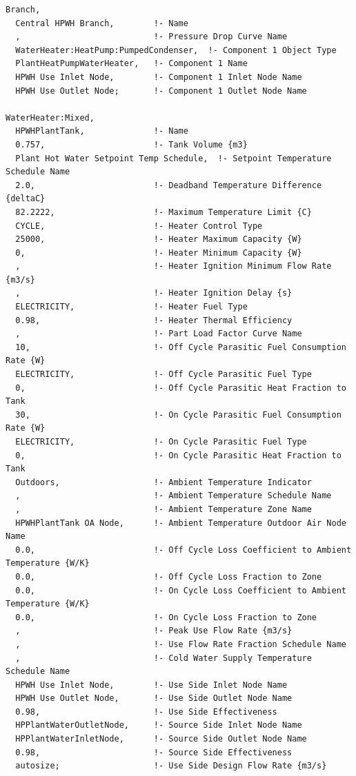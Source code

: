 \begin{lstlisting}
Branch,
  Central HPWH Branch,        !- Name
  ,                           !- Pressure Drop Curve Name
  WaterHeater:HeatPump:PumpedCondenser,  !- Component 1 Object Type
  PlantHeatPumpWaterHeater,   !- Component 1 Name
  HPWH Use Inlet Node,        !- Component 1 Inlet Node Name
  HPWH Use Outlet Node;       !- Component 1 Outlet Node Name

WaterHeater:Mixed,
  HPWHPlantTank,              !- Name
  0.757,                      !- Tank Volume {m3}
  Plant Hot Water Setpoint Temp Schedule,  !- Setpoint Temperature Schedule Name
  2.0,                        !- Deadband Temperature Difference {deltaC}
  82.2222,                    !- Maximum Temperature Limit {C}
  CYCLE,                      !- Heater Control Type
  25000,                      !- Heater Maximum Capacity {W}
  0,                          !- Heater Minimum Capacity {W}
  ,                           !- Heater Ignition Minimum Flow Rate {m3/s}
  ,                           !- Heater Ignition Delay {s}
  ELECTRICITY,                !- Heater Fuel Type
  0.98,                       !- Heater Thermal Efficiency
  ,                           !- Part Load Factor Curve Name
  10,                         !- Off Cycle Parasitic Fuel Consumption Rate {W}
  ELECTRICITY,                !- Off Cycle Parasitic Fuel Type
  0,                          !- Off Cycle Parasitic Heat Fraction to Tank
  30,                         !- On Cycle Parasitic Fuel Consumption Rate {W}
  ELECTRICITY,                !- On Cycle Parasitic Fuel Type
  0,                          !- On Cycle Parasitic Heat Fraction to Tank
  Outdoors,                   !- Ambient Temperature Indicator
  ,                           !- Ambient Temperature Schedule Name
  ,                           !- Ambient Temperature Zone Name
  HPWHPlantTank OA Node,      !- Ambient Temperature Outdoor Air Node Name
  0.0,                        !- Off Cycle Loss Coefficient to Ambient Temperature {W/K}
  0.0,                        !- Off Cycle Loss Fraction to Zone
  0.0,                        !- On Cycle Loss Coefficient to Ambient Temperature {W/K}
  0.0,                        !- On Cycle Loss Fraction to Zone
  ,                           !- Peak Use Flow Rate {m3/s}
  ,                           !- Use Flow Rate Fraction Schedule Name
  ,                           !- Cold Water Supply Temperature Schedule Name
  HPWH Use Inlet Node,        !- Use Side Inlet Node Name
  HPWH Use Outlet Node,       !- Use Side Outlet Node Name
  0.98,                       !- Use Side Effectiveness
  HPPlantWaterOutletNode,     !- Source Side Inlet Node Name
  HPPlantWaterInletNode,      !- Source Side Outlet Node Name
  0.98,                       !- Source Side Effectiveness
  autosize;                   !- Use Side Design Flow Rate {m3/s}


\end{lstlisting}
